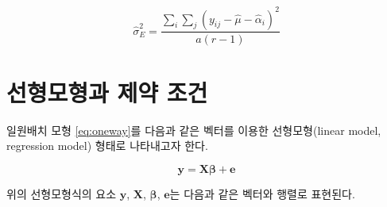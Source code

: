 \documentclass[
]{book}
\theoremstyle{definition}
\theoremstyle{definition}
\theoremstyle{definition}
\theoremstyle{definition}
\theoremstyle{remark}
\begin{document}
\begin{equation*} 
\hat \sigma_E^2 = \frac{ \sum_i \sum_j (y_{ij} - \hat \mu -\hat \alpha_i )^2}{a(r-1)}
\end{equation*}

\hypertarget{uxc120uxd615uxbaa8uxd615uxacfc-uxc81cuxc57d-uxc870uxac74}{%
\section{선형모형과 제약 조건}\label{uxc120uxd615uxbaa8uxd615uxacfc-uxc81cuxc57d-uxc870uxac74}}

일원배치 모형 \eqref{eq:oneway}를 다음과 같은 벡터를 이용한 선형모형(linear model, regression model) 형태로 나타내고자 한다.

\begin{equation}
\bm y = \bm X \bm \beta +\bm e
\label{eq:lm}
\end{equation}

위의 선형모형식의 요소 \(\bm y\), \(\bm X\), \(\bm \beta\), \(\bm e\)는 다음과 같은 벡터와 행렬로 표현된다.
\end{document}
